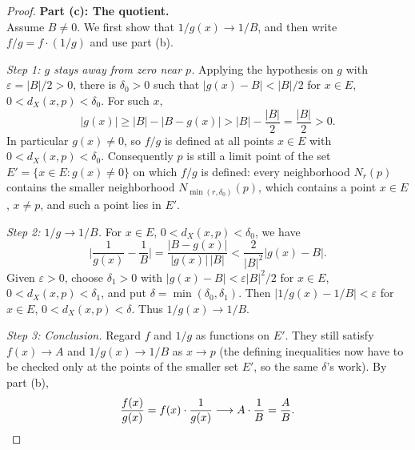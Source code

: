\documentclass{article}
\theoremstyle{mythm}
\begin{document}
\begin{proof}
\textbf{Part (c): The quotient.}\\
Assume $B \neq 0$. We first show that $1/g(x) \to 1/B$, and then write $f/g = f \cdot (1/g)$ and use part (b).

\textit{Step 1: $g$ stays away from zero near $p$.} Applying the hypothesis on $g$ with $\varepsilon = |B|/2 > 0$, there is $\delta_0 > 0$ such that $|g(x) - B| < |B|/2$ for $x \in E$, $0 < d_X(x,p) < \delta_0$. For such $x$,
\[
|g(x)| \geq |B| - |B - g(x)| > |B| - \frac{|B|}{2} = \frac{|B|}{2} > 0.
\]
In particular $g(x) \neq 0$, so $f/g$ is defined at all points $x \in E$ with $0 < d_X(x,p) < \delta_0$. Consequently $p$ is still a limit point of the set $E' = \{x \in E : g(x) \neq 0\}$ on which $f/g$ is defined: every neighborhood $N_r(p)$ contains the smaller neighborhood $N_{\min(r,\delta_0)}(p)$, which contains a point $x \in E$, $x \neq p$, and such a point lies in $E'$.

\textit{Step 2: $1/g \to 1/B$.} For $x \in E$, $0 < d_X(x,p) < \delta_0$, we have
\[
\Big| \frac{1}{g(x)} - \frac{1}{B} \Big| = \frac{|B - g(x)|}{|g(x)|\,|B|} < \frac{2}{|B|^2} |g(x) - B|.
\]
Given $\varepsilon > 0$, choose $\delta_1 > 0$ with $|g(x) - B| < \varepsilon |B|^2 / 2$ for $x \in E$, $0 < d_X(x,p) < \delta_1$, and put $\delta = \min(\delta_0, \delta_1)$. Then $|1/g(x) - 1/B| < \varepsilon$ for $x \in E$, $0 < d_X(x,p) < \delta$. Thus $1/g(x) \to 1/B$.

\textit{Step 3: Conclusion.} Regard $f$ and $1/g$ as functions on $E'$. They still satisfy $f(x) \to A$ and $1/g(x) \to 1/B$ as $x \to p$ (the defining inequalities now have to be checked only at the points of the smaller set $E'$, so the same $\delta$'s work). By part (b),
\[
\frac{f(x)}{g(x)} = f(x) \cdot \frac{1}{g(x)} \longrightarrow A \cdot \frac{1}{B} = \frac{A}{B}. \qedhere
\]
\end{proof}
\end{document}
